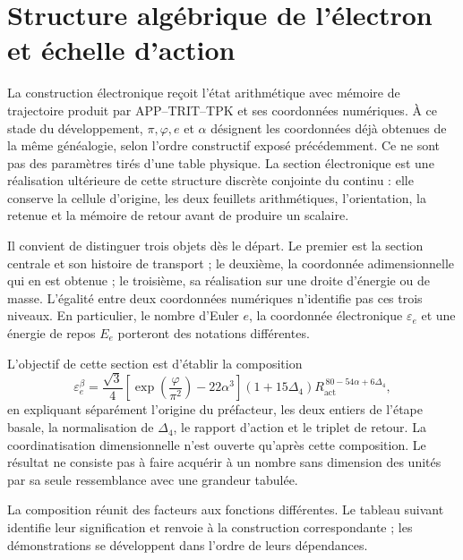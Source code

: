 \section{Structure algébrique de l'électron et échelle d'action}
\label{sec:electron}

La construction électronique reçoit l'état arithmétique avec mémoire de trajectoire produit par APP--TRIT--TPK et ses coordonnées numériques. À ce stade du développement, \(\pi,\varphi,e\) et \(\alpha\) désignent les coordonnées déjà obtenues de la même généalogie, selon l'ordre constructif exposé précédemment. Ce ne sont pas des paramètres tirés d'une table physique. La section électronique est une réalisation ultérieure de cette structure discrète conjointe du continu : elle conserve la cellule d'origine, les deux feuillets arithmétiques, l'orientation, la retenue et la mémoire de retour avant de produire un scalaire.

Il convient de distinguer trois objets dès le départ. Le premier est la section
centrale et son histoire de transport ; le deuxième, la coordonnée
adimensionnelle qui en est obtenue ; le troisième, sa réalisation sur une
droite d'énergie ou de masse. L'égalité entre deux coordonnées numériques
n'identifie pas ces trois niveaux. En particulier, le nombre d'Euler \(e\),
la coordonnée électronique \(\varepsilon_e\) et une énergie de repos
\(E_e\) porteront des notations différentes.

L'objectif de cette section est d'établir la composition
\begin{equation}
 \varepsilon_e^{\beta}
 =\frac{\sqrt3}{4}
  \left[\exp\!\left(\frac{\varphi}{\pi^2}\right)-22\alpha^3\right]
  (1+15\Delta_4)
  R_{\mathrm{act}}^{\,80-54\alpha+6\Delta_4},
 \label{eq:el-formula-completa}
\end{equation}
en expliquant séparément l'origine du préfacteur, les deux entiers de
l'étape basale, la normalisation de \(\Delta_4\), le rapport d'action et le
triplet de retour. La coordinatisation dimensionnelle n'est ouverte qu'après
cette composition. Le résultat ne consiste pas à faire acquérir à un nombre
sans dimension des unités par sa seule ressemblance avec une grandeur
tabulée.

La composition réunit des facteurs aux fonctions différentes. Le tableau
suivant identifie leur signification et renvoie à la construction
correspondante ; les démonstrations se développent dans l'ordre de leurs
dépendances.

